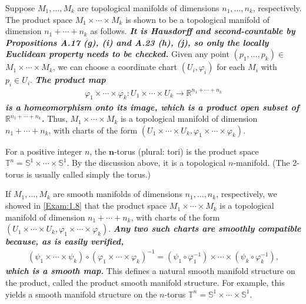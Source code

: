 \begin{example}
    Suppose $M_1, \ldots, M_k$ are topological manifolds of dimensions $n_1, \ldots, n_k$, respectively. The product space $M_1 \times \cdots \times M_k$ is shown to be a topological manifold of dimension $n_1+\cdots+n_k$ as follows. \textbf{\itshape It is Hausdorff and second-countable by Propositions A.17 (g), (i) and A.23 (h), (j), so only the locally Euclidean property needs to be checked.} Given any point $\left(p_1, \ldots, p_k\right) \in$ $M_1 \times \cdots \times M_k$, we can choose a coordinate chart $\left(U_i, \varphi_i\right)$ for each $M_i$ with $p_i \in U_i$. {\bf\itshape The product map
\begin{align*}
\varphi_1 \times \cdots \times \varphi_k: U_1 \times \cdots \times U_k \rightarrow \mathbb{R}^{n_1+\cdots+n_k}
\end{align*}
is a homeomorphism onto its image, which is a product open subset of $\mathbb{R}^{n_1+\cdots+n_k}$.} Thus, $M_1 \times \cdots \times M_k$ is a topological manifold of dimension $n_1+\cdots+n_k$, with charts of the form $\left(U_1 \times \cdots \times U_k, \varphi_1 \times \cdots \times \varphi_k\right)$.

\end{example}
\begin{example}
    For a positive integer $n$, the $\boldsymbol{n}$-torus (plural: tori) is the product space $\mathbb{T}^n=\mathbb{S}^1 \times \cdots \times \mathbb{S}^1$. By the discussion above, it is a topological $n$-manifold. (The 2-torus is usually called simply the torus.)
\end{example}
\begin{example}
    If $M_1, \ldots, M_k$ are smooth manifolds of dimensions $n_1, \ldots, n_k$, respectively, we showed in \autoref{Exam:1.8} that the product space $M_1 \times \cdots \times M_k$ is a topological manifold of dimension $n_1+\cdots+n_k$, with charts of the form $\left(U_1 \times \cdots \times U_k, \varphi_1 \times \cdots \times \varphi_k\right)$. {\bf\itshape Any two such charts are smoothly compatible because, as is easily verified,
    \begin{align*}
    \left(\psi_1 \times \cdots \times \psi_k\right) \circ\left(\varphi_1 \times \cdots \times \varphi_k\right)^{-1}=\left(\psi_1 \circ \varphi_1^{-1}\right) \times \cdots \times\left(\psi_k \circ \varphi_k^{-1}\right),
    \end{align*}
    which is a smooth map.} This defines a natural smooth manifold structure on the product, called the product smooth manifold structure. For example, this yields a smooth manifold structure on the $n$-torus $\mathbb{T}^n=\mathbb{S}^1 \times \cdots \times \mathbb{S}^1$.
\end{example}
